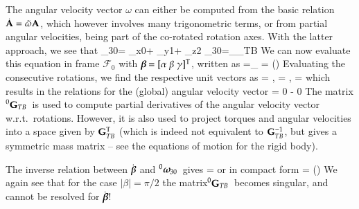 The angular velocity vector $\omega$ can either be computed from the basic relation $\dot {\mathbf{A}} = \tilde \omega \mathbf{A}$, which however involves many trigonometric terms, or from partial angular velocities, being part of the co-rotated rotation axes.
With the latter approach, we see that
\be
  \tomega_{30}=\dot{\alpha} \ev_{x0}+\dot{\beta} \ev_{y1}+\dot{\gamma} \ev_{z2} \quad {} \quad 
  \tomega_{30}=_{\Gm_{TB}} \vr{\dot{\alpha}}{\dot{\beta}}{\dot{\gamma}}
\ee
We can now evaluate this equation in frame $\mathcal{F}_0$ with $\mbox{\boldmath $\beta$ \unboldmath}\!\!=[\alpha\;\beta\;\gamma]^\mathrm{T}$, written as
\be 
  =_{} \vr{\dot{\alpha}}{\dot{\beta}}{\dot{\gamma}} = 
  (\tbeta) \dot{\tbeta} \eqDot
\ee
Evaluating the consecutive rotations, we find the respective unit vectors as
\be
   = , \quad
   = , \quad {} \quad
   =  \eqDot
\ee
which results in the relations for the (global) angular velocity vector
\be \label{eq:theory:rotations:TaitBryanG}
   = 
   { \beta}
  {0}{ \alpha} {- \alpha {} \beta}
  {0}{ \alpha} { \alpha {} \beta}  
  \vr{\dot{\alpha}}{\dot{\beta}}{\dot{\gamma}} 
\ee
The matrix $\prescript{0}{}{\mathbf{G}}_{TB}\,$ is used to compute partial derivatives of the angular velocity vector w.r.t.\ rotations.
However, it is also used to project torques and angular velocities into a space given by $\mathbf{G}_{TB}^\mathrm{T}$ (which is indeed not equivalent to $\mathbf{G}_{TB}^{-1}$, but gives a symmetric mass matrix -- see the equations of motion for the rigid body).

The inverse relation between $\dot {\mbox{\boldmath $\beta$ \unboldmath}\!\!}$ and $\prescript{0}{}{\mbox{\boldmath $\omega$ \unboldmath}\!\!}_{30}\,$ gives
\be \label{eq:theory:rotations:TaitBryanGinv}
  \vr{\dot{\alpha}}{\dot{\beta}}{\dot{\gamma}} =    
\ee
or in compact form
\be
  \dot{\tbeta} = (\tbeta)  
\ee
We again see that for the case $\vert \beta \vert = \pi/2$ the matrix$\prescript{0}{}{\mathbf{G}}_{TB}\,$ becomes singular, and  cannot be resolved for $\dot{\mbox{\boldmath $\beta$ \unboldmath}\!\!}$!

